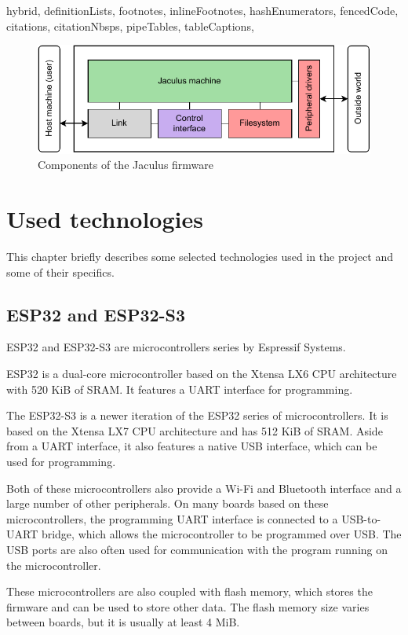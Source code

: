 \begin{markdown*}{%
  hybrid,
  definitionLists,
  footnotes,
  inlineFootnotes,
  hashEnumerators,
  fencedCode,
  citations,
  citationNbsps,
  pipeTables,
  tableCaptions,
}
\begin{figure}[!ht]
  \centering
  \includegraphics[width=\textwidth]{img/jaculus-design}
  \caption{Components of the Jaculus firmware}
  \label{fig:jaculus-design}
\end{figure}


\chapter{Used technologies}

This chapter briefly describes some selected technologies used in the project and some of their specifics.

\section{ESP32 and ESP32-S3}

ESP32\cite{esp32} and ESP32-S3\cite{esp32-s3} are microcontrollers series by Espressif Systems.

ESP32 is a dual-core microcontroller based on the Xtensa LX6 CPU architecture with 520 KiB of SRAM. It features a UART interface for programming.

The ESP32-S3 is a newer iteration of the ESP32 series of microcontrollers. It is based on the Xtensa LX7 CPU architecture and has 512 KiB of SRAM. Aside from a UART interface, it also features a native USB interface, which can be used for programming.

Both of these microcontrollers also provide a Wi-Fi and Bluetooth interface and a large number of other peripherals. On many boards based on these microcontrollers, the programming UART interface is connected to a USB-to-UART bridge, which allows the microcontroller to be programmed over USB. The USB ports are also often used for communication with the program running on the microcontroller.

These microcontrollers are also coupled with flash memory, which stores the firmware and can be used to store other data. The flash memory size varies between boards, but it is usually at least 4 MiB.


\end{markdown*}
